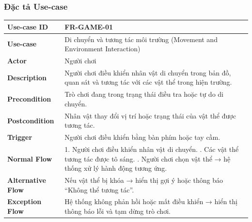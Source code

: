 \subsubsection{Đặc tả Use-case}

\begin{table}[H]
\centering
\begin{tabular}{|p{4cm}|p{10cm}|}
\hline
\textbf{Use-case ID} & FR-GAME-01 \\ \hline
\textbf{Use-case} & Di chuyển và tương tác môi trường (Movement and Environment Interaction) \\ \hline
\textbf{Actor} & Người chơi \\ \hline
\textbf{Description} & Người chơi điều khiển nhân vật di chuyển trong bản đồ, quan sát và tương tác với các vật thể trong hiện trường. \\ \hline
\textbf{Precondition} & Trò chơi đang trong trạng thái điều tra hoặc tự do di chuyển. \\ \hline
\textbf{Postcondition} & Nhân vật thay đổi vị trí hoặc trạng thái của vật thể được tương tác. \\ \hline
\textbf{Trigger} & Người chơi điều khiển bằng bàn phím hoặc tay cầm. \\ \hline
\textbf{Normal Flow} &
1. Người chơi điều khiển nhân vật di chuyển. \newline
2. Các vật thể tương tác được tô sáng. \newline
3. Người chơi chọn vật thể → hệ thống xử lý hành động tương ứng. \\ \hline
\textbf{Alternative Flow} &
Nếu vật thể bị khóa → hiển thị gợi ý hoặc thông báo “Không thể tương tác”. \\ \hline
\textbf{Exception Flow} &
Hệ thống không phản hồi hoặc mất điều khiển → hiển thị thông báo lỗi và tạm dừng trò chơi. \\ \hline
\end{tabular}
\end{table}


